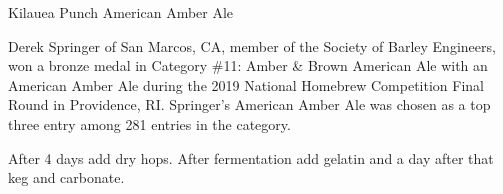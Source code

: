 \begin{recipe}{Kilauea Punch American Amber Ale}

\begin{aboutblock}
Derek Springer of San Marcos, CA, member of the Society of Barley Engineers,
won a bronze medal in Category \#11: Amber \& Brown American Ale with an
American Amber Ale during the 2019 National Homebrew Competition Final Round
in Providence, RI. Springer's American Amber Ale was chosen as a top three
entry among 281 entries in the category. \sourceaha
\end{aboutblock}


\begin{methodandtiming}
 
\begin{mashsteps}
\end{mashsteps}

\begin{fermentationsteps}
\end{fermentationsteps}

\begin{directions}
After 4 days add dry hops. After fermentation add gelatin and a day after that
keg and carbonate.
\end{directions}

\end{methodandtiming}

\recipebreak

\begin{ingredientsblock}

\begin{malts}
\end{malts}

\begin{hops}
\end{hops}


\end{ingredientsblock}

\end{recipe}

